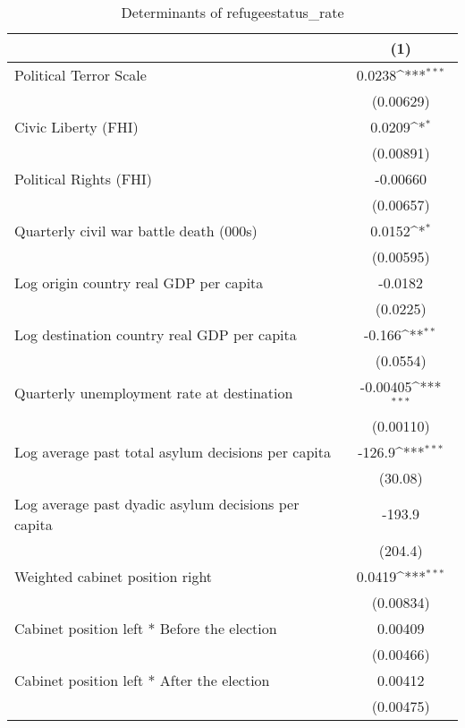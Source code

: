 \begin{table}[htbp]\centering
\def\sym#1{\ifmmode^{#1}\else\(^{#1}\)\fi}
\caption{Determinants of refugeestatus\_rate}
\begin{tabular}{l*{1}{c}}
\hline\hline
                    &\multicolumn{1}{c}{(1)}         \\
\hline
Political Terror Scale&      0.0238\sym{***}\\
                    &   (0.00629)         \\
[1em]
Civic Liberty (FHI) &      0.0209\sym{*}  \\
                    &   (0.00891)         \\
[1em]
Political Rights (FHI)&    -0.00660         \\
                    &   (0.00657)         \\
[1em]
Quarterly civil war battle death (000s)&      0.0152\sym{*}  \\
                    &   (0.00595)         \\
[1em]
Log origin country real GDP per capita&     -0.0182         \\
                    &    (0.0225)         \\
[1em]
Log destination country real GDP per capita&      -0.166\sym{**} \\
                    &    (0.0554)         \\
[1em]
Quarterly unemployment rate at destination&    -0.00405\sym{***}\\
                    &   (0.00110)         \\
[1em]
Log average past total asylum decisions per capita&      -126.9\sym{***}\\
                    &     (30.08)         \\
[1em]
Log average past dyadic asylum decisions per capita&      -193.9         \\
                    &     (204.4)         \\
[1em]
Weighted cabinet position right&      0.0419\sym{***}\\
                    &   (0.00834)         \\
[1em]
Cabinet position left * Before the election&     0.00409         \\
                    &   (0.00466)         \\
[1em]
Cabinet position left * After the election&     0.00412         \\
                    &   (0.00475)         \\

\end{tabular}
\end{table}
